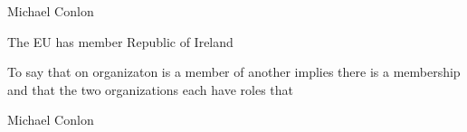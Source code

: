\documentclass[letterpaper,10pt,english]{sphinxmanual}
\begin{document}
\begin{sphinxShadowBox}

\sphinxAtStartPar
Michael Conlon 
\end{sphinxShadowBox}

\begin{sphinxShadowBox}

\sphinxAtStartPar
{\hyperref[\detokenize{doc-ORG_0000001::doc}]{}}
\end{sphinxShadowBox}

\begin{sphinxShadowBox}

\sphinxAtStartPar
{\hyperref[\detokenize{doc-ORG_0000001::doc}]{}}
\end{sphinxShadowBox}

\begin{sphinxShadowBox}

\sphinxAtStartPar
{\hyperref[\detokenize{doc-ORG_2000015::doc}]{}}
\end{sphinxShadowBox}

\begin{sphinxShadowBox}

\sphinxAtStartPar
The EU has member Republic of Ireland
\end{sphinxShadowBox}

\begin{sphinxShadowBox}

\sphinxAtStartPar
To say that on organizaton is a member of another implies there is a membership and that the two organizations each have  roles that
\end{sphinxShadowBox}

\begin{sphinxShadowBox}

\sphinxAtStartPar
Michael Conlon 
\end{sphinxShadowBox}
\begin{quote}

\ignorespaces \end{quote}
\end{document}
